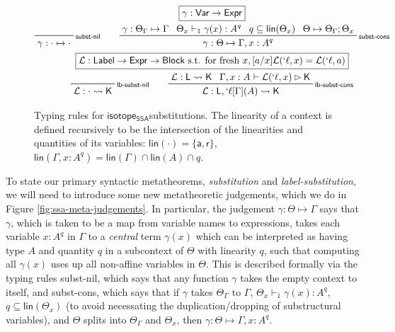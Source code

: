 \documentclass[acmsmall,screen,review]{acmart}
\newcommand{\mc}[1]{\ensuremath{\mathcal{#1}}}
\newcommand{\ms}[1]{\ensuremath{\mathsf{#1}}}
\newcommand{\lbl}[1]{{`#1}}
\newcommand{\brb}[2]{\ms{br}\;#1\;#2}
\newcommand{\lbrb}[2]{\brb{\lbl{#1}}{#2}}
\newcommand{\csplits}[3]{#1 \mapsto #2;#3}
\newcommand{\tlin}[2]{#2 \subseteq \ms{lin}(#1)}
\newcommand{\thyp}[3]{#1: {#2}^{#3}}
\newcommand{\lhyp}[3]{#1[#2](#3)}
\newcommand{\llhyp}[3]{\lhyp{\lbl{#1}}{#2}{#3}}
\newcommand{\rle}[1]{{\scriptsize\textsf{#1}}}
\newcommand{\tint}{{\{\ms{a}, \ms{r}\}}}
\newcommand{\hasty}[5]{#1 \vdash_{#2} #3: {#4}^{#5}}
\newcommand{\haslb}[3]{#1 \vdash #2 \rhd #3}
\newcommand{\issubst}[3]{#1: #2 \mapsto #3}
\newcommand{\lbsubst}[3]{#1: #2 \rightsquigarrow #3}
\newcommand{\isotopessa}{\ms{isotope_{SSA}}}
\begin{document}
\begin{figure}
  \begin{gather*}
    \boxed{\gamma: \ms{Var} \to \ms{Expr}}
    \\
    \prftree[r]{\rle{subst-nil}}
      {\issubst{\gamma}{\cdot}{\cdot}}
      \qquad
    \prftree[r]{\rle{subst-cons}}
      {\issubst{\gamma}{\Theta_\Gamma}{\Gamma}}
      {\hasty{\Theta_x}{1}{\gamma(x)}{A}{q}}
      {\tlin{\Theta_x}{q}}
      {\csplits{\Theta}{\Theta_\Gamma}{\Theta_x}}
      {\issubst{\gamma}{\Theta}{\Gamma, \thyp{x}{A}{q}}}
    \\
    \boxed{\mc{L}: \ms{Label} \to \ms{Expr} \to \ms{Block} \text{ s.t. for fresh } x, [a/x]\mc{L}(\lbl{\ell}, x) = \mc{L}(\lbl{\ell}, a)}
    \\
    \prftree[r]{\rle{lb-subst-nil}}
    {\lbsubst{\mc{L}}{\cdot}{\ms{K}}}
      \qquad
    \prftree[r]{\rle{lb-subst-cons}}
      {\lbsubst{\mc{L}}{\ms{L}}{\ms{K}}}
      {\haslb{\Gamma, \thyp{x}{A}{}}{\mc{L}(\lbl{\ell}, x)}{\ms{K}}}
      {\lbsubst{\mc{L}}{\ms{L}, \llhyp{\ell}{\Gamma}{A}}{\ms{K}}}
  \end{gather*}
  \caption{ Typing rules for \isotopessa substitutions. The linearity of a
    context is defined recursively to be the intersection of the linearities and
    quantities of its variables: \(\ms{lin}(\cdot) = \tint\),
    \(\ms{lin}(\Gamma, \thyp{x}{A}{q}) = \ms{lin}(\Gamma) \cap \ms{lin}(A) \cap
    q\). 
  } 
  \label{fig:ssa-subst-typing}
\end{figure}

To state our primary syntactic metatheorems, \textit{substitution} and
\textit{label-substitution}, we will need to introduce some new metatheoretic
judgements, which we do in Figure \ref{fig:ssa-meta-judgements}. In particular,
the judgement \(\issubst{\gamma}{\Theta}{\Gamma}\) says that \(\gamma\), which
is taken to be a map from variable names to expressions, takes each variable
\(\thyp{x}{A}{q}\) in \(\Gamma\) to a \textit{central} term \(\gamma(x)\) which
can be interpreted as having type \(A\) and quantity \(q\) in a subcontext of
\(\Theta\) with linearity \(q\), such that computing all \(\gamma(x)\) uses up
all non-affine variables in \(\Theta\). This is described formally via the
typing rules \rle{subst-nil}, which says that any function \(\gamma\) takes the
empty context to itself, and \rle{subst-cons}, which says that if \(\gamma\)
takes \(\Theta_\Gamma\) to \(\Gamma\), \(\hasty{\Theta_x}{1}{\gamma(x)}{A}{q}\),
\(q \subseteq \ms{lin}(\Theta_x)\) (to avoid necessating the
duplication/dropping of substructural variables), and \(\Theta\) splits into
\(\Theta_\Gamma\) and \(\Theta_x\), then \(\issubst{\gamma}{\Theta}{\Gamma,
\thyp{x}{A}{q}}\).
\end{document}
